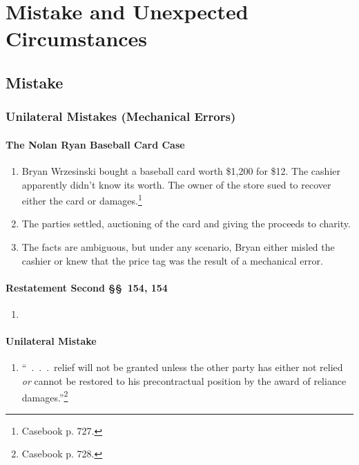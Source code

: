 \section{Mistake and Unexpected Circumstances}

\subsection{Mistake}

\subsubsection{Unilateral Mistakes (Mechanical Errors)}

\paragraph{The Nolan Ryan Baseball Card Case}

\begin{enumerate}
    \item Bryan Wrzesinski bought a baseball card worth \$1,200 for \$12. The 
    cashier apparently didn't know its worth. The owner of the store sued to 
    recover either the card or damages.\footnote{Casebook p. 727.}
    \item The parties settled, auctioning of the card and giving the proceeds 
    to charity.
    \item The facts are ambiguous, but under any scenario, Bryan either misled 
    the cashier or knew that the price tag was the result of a mechanical 
    error.
\end{enumerate}

\paragraph{Restatement Second \S\S\ 154, 154} %

\begin{enumerate}
    \item %
\end{enumerate}

\paragraph{Unilateral Mistake}

\begin{enumerate}
    \item ``~.~.~.~relief will not be granted unless the other party has 
    either not relied \emph{or} cannot be restored to his precontractual 
    position by the award of reliance damages.''\footnote{Casebook p. 728.}
\end{enumerate}

